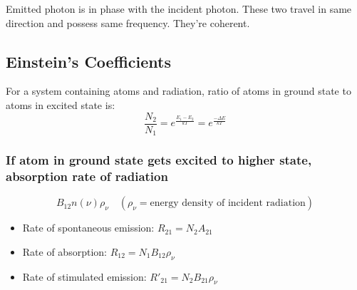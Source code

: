 \documentclass{article}
\begin{document}
Emitted photon is in phase with the incident photon. These two travel in same direction and possess same frequency. They're coherent.

\subsection*{Einstein's Coefficients}
For a system containing atoms and radiation, ratio of atoms in ground state to atoms in excited state is:
\[
\frac{N_2}{N_1} = e^{\frac{E_1 - E_2}{kT}} = e^{\frac{-\Delta E}{kT}}
\]

\subsubsection*{If atom in ground state gets excited to higher state, absorption rate of radiation}
\[
B_{12} n(\nu) \rho_\nu \quad (\rho_\nu = \text{energy density of incident radiation})
\]
\begin{itemize}
    \item Rate of spontaneous emission: \(R_{21} = N_2 A_{21}\)
    \item Rate of absorption: \(R_{12} = N_1 B_{12} \rho_\nu\)
    \item Rate of stimulated emission: \(R'_{21} = N_2 B_{21} \rho_\nu\)
\end{itemize}
\end{document}
